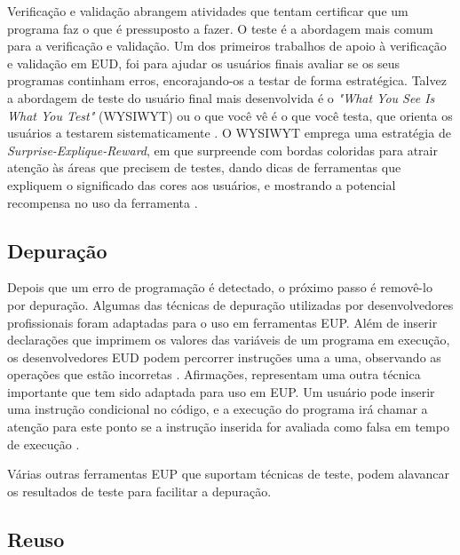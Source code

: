 Verificação e validação abrangem atividades que tentam certificar que um programa faz o que é pressuposto a fazer. O teste é a abordagem mais comum para a verificação e validação. Um dos primeiros trabalhos de apoio à verificação e validação em EUD, foi para ajudar os usuários finais avaliar se os seus programas continham erros, encorajando-os a testar de forma estratégica. Talvez a abordagem de teste do usuário final mais desenvolvida é o \textit{"What You See Is What You Test"} (WYSIWYT) ou o que você vê é o que você testa, que orienta os usuários a testarem sistematicamente \cite{fisher2006integrating}. O WYSIWYT emprega uma estratégia de \textit{Surprise-Explique-Reward}, em que surpreende com bordas coloridas para atrair atenção às áreas que precisem de testes, dando dicas de ferramentas que expliquem o significado das cores aos usuários, e mostrando a potencial recompensa no uso da ferramenta \cite{wilson2003harnessing}.

\subsection{Depuração}

Depois que um erro de programação é detectado, o próximo passo é removê-lo por depuração. Algumas das técnicas de depuração utilizadas por desenvolvedores profissionais foram adaptadas para o uso em ferramentas EUP. Além de inserir declarações que imprimem os valores das variáveis de um programa em execução, os desenvolvedores EUD podem percorrer instruções uma a uma, observando as operações que estão incorretas \cite{leshed2008coscripter}. Afirmações, representam uma outra técnica importante que tem sido adaptada para uso em EUP. Um usuário pode inserir uma instrução condicional no código, e a execução do programa irá chamar a atenção para este ponto se a instrução inserida for avaliada como falsa em tempo de execução \cite{burnett10,koesnandar2008using,scaffidi2008topes}.

Várias outras ferramentas EUP que suportam técnicas de teste, podem alavancar os resultados de teste para facilitar a depuração.

\subsection{Reuso}

